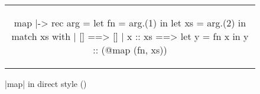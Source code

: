 \begin{figure}[tp]
\begin{tabular}{c}
\begin{Lambd}
map |-> rec arg =
  let fn = arg.(1) in
  let xs = arg.(2) in
  match xs with
  | [] ==> 
      []
  | x :: xs ==>
      let y = fn x in
      y :: (@map (fn, xs))
\end{Lambd}
\end{tabular}
\caption{\lambd|map| in direct style (\LambdaLang)}
\label{fig:lambda_map}
\end{figure}